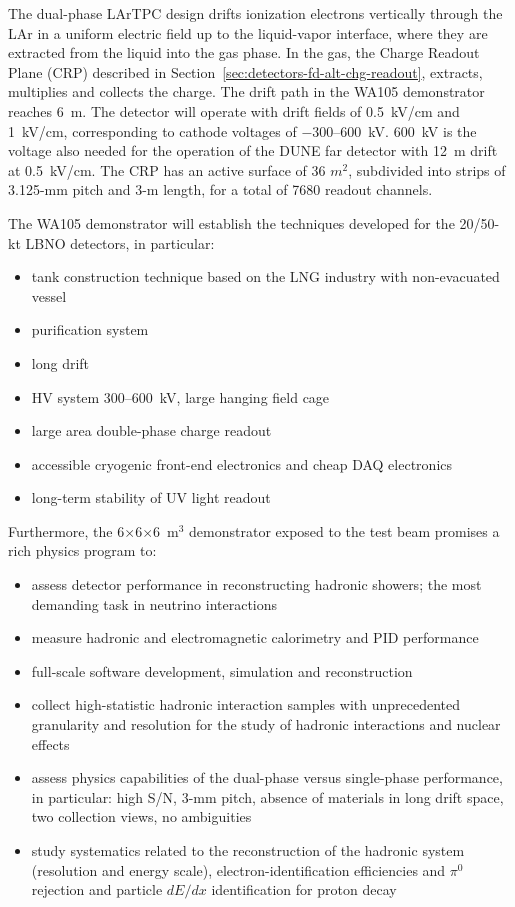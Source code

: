 {The dual-phase LArTPC design drifts ionization electrons
vertically through the LAr in a uniform electric field up to the
liquid-vapor interface, where they are extracted from the liquid into
the gas phase.
In the gas, the Charge Readout Plane (CRP) described in
Section~\ref{sec:detectors-fd-alt-chg-readout}, 
extracts, multiplies and collects the charge. 
%
The drift path in the WA105 demonstrator reaches 6~m. The detector
will operate with drift fields of 0.5~kV/cm and 1~kV/cm, corresponding
to cathode voltages of $-$300--600~kV. 600~kV is the voltage also
needed for the operation of the DUNE far detector with 12~m drift at
0.5~kV/cm. The CRP has an active surface of 36 $m^2$, subdivided into
strips of 3.125-mm pitch and 3-m length, for a total of \num{7680}
readout channels.

The WA105 demonstrator will establish the techniques developed for
the 20/50-kt LBNO detectors, in particular:
\begin{itemize}
\item{tank construction technique based on the LNG industry with non-evacuated vessel}
\item{purification system}
\item{long drift}
\item{HV system 300--600~kV, large hanging field cage}
\item{large area double-phase charge readout}
\item{accessible cryogenic front-end electronics and cheap DAQ electronics}
\item{long-term stability of UV light readout}
\end{itemize}

Furthermore, the 6$\times$6$\times$6~m$^3$ demonstrator exposed to the
test beam promises a rich physics program to:
\begin{itemize}
\item{assess detector performance in reconstructing hadronic showers; the most demanding task in neutrino interactions}
\item{measure hadronic and electromagnetic calorimetry and PID performance}
\item{full-scale software development, simulation and reconstruction}
\item{collect high-statistic hadronic interaction samples with unprecedented granularity and resolution for the study of hadronic interactions and nuclear effects}
\item{assess physics capabilities of the dual-phase versus
  single-phase performance, in particular: high S/N, 3-mm pitch,
  absence of materials in long drift space, two collection views, no
  ambiguities}
\item{study systematics related to
  the reconstruction of the hadronic system (resolution and energy
  scale), electron-identification efficiencies and $\pi^0$ rejection and particle $dE/dx$ identification for proton decay}
\end{itemize}



}
